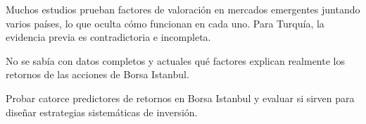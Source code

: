 \documentclass{article}
\newcommand{\bodysize}{\fontsize{26}{34.3}\selectfont}
\newcommand{\cardtitlesize}{\fontsize{30.7}{36.8}\selectfont}
\newcommand{\smallsize}{\fontsize{21.3}{27.7}\selectfont}
\newcommand{\cardtitle}[2][navy]{{\color{#1}\cardtitlesize\bfseries\textls[110]{\MakeUppercase{#2}}}\par\vspace{7mm}}
\begin{document}
\vfill
\hspace*{34mm}\begin{minipage}{773mm}
\begin{tcolorbox}[enhanced, sharp corners, colback=navy, boxrule=0pt, left=16mm, right=16mm, top=12mm, bottom=11mm,
  fontupper=\bodysize\raggedright, overlay={\fill[gold] (frame.north west) rectangle ([yshift=-5mm]frame.north east);}]
\begin{minipage}[t]{174.8mm}\raggedright{\color{acento}\smallsize\bfseries{}}\par{}\end{minipage}\hfill\begin{minipage}[t]{174.8mm}\raggedright{\color{acento}\smallsize\bfseries{}}\par{}\end{minipage}\hfill\begin{minipage}[t]{174.8mm}\raggedright{\color{acento}\smallsize\bfseries{}}\par{}\end{minipage}\hfill\begin{minipage}[t]{174.8mm}\raggedright{\color{acento}\smallsize\bfseries{}}\par{}\end{minipage}
\end{tcolorbox}
\end{minipage}

\vfill
\hspace*{34mm}\begin{minipage}{773mm}
\begin{tcbraster}[raster columns=3, raster equal height, raster column skip=16mm]
\begin{tcolorbox}[card]\cardtitle{Contexto}Muchos estudios prueban factores de valoración en mercados emergentes juntando varios países, lo que oculta cómo funcionan en cada uno. Para Turquía, la evidencia previa es contradictoria e incompleta.\end{tcolorbox}
\begin{tcolorbox}[card]\cardtitle{Problema}No se sabía con datos completos y actuales qué factores explican realmente los retornos de las acciones de Borsa Istanbul.\end{tcolorbox}
\begin{tcolorbox}[card]\cardtitle{Objetivo}Probar catorce predictores de retornos en Borsa Istanbul y evaluar si sirven para diseñar estrategias sistemáticas de inversión.\end{tcolorbox}
\end{tcbraster}
\end{minipage}
\end{document}
